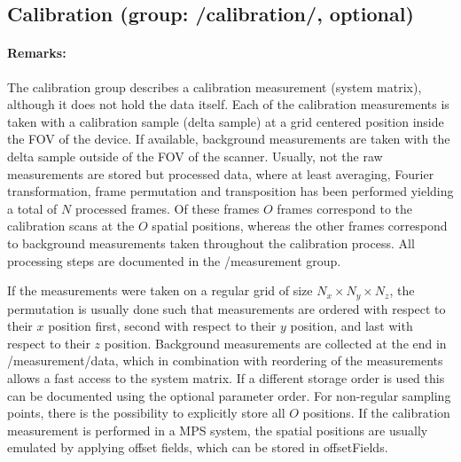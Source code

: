 \documentclass[landscape,a4paper]{article} %
\newcommand{\inlvar}[1]{{\ttfamily#1}}
\begin{document}
\newpage
\subsection{Calibration (group: \inlvar{/calibration/}, optional)}

\begin{multicols}{2}
\paragraph{Remarks:}
The calibration group describes a calibration measurement (system matrix), although it does not hold the data itself. Each of the calibration measurements is taken with a calibration sample (delta sample) at a grid centered position inside the FOV of the device. If available, background measurements are taken with the delta sample outside of the FOV of the scanner. Usually, not the raw measurements are stored but processed data, where at least averaging, Fourier transformation, frame permutation and transposition has been performed yielding a total of $N$ processed frames. Of these frames $O$ frames correspond to the calibration scans at the $O$ spatial positions, whereas the other frames correspond to background measurements taken throughout the calibration process. All processing steps are documented in the \inlvar{/measurement} group.

If the measurements were taken on a regular grid of size $N_x \times N_y \times N_z$, the permutation is usually done such that measurements are ordered with respect to their $x$ position first, second with respect to their $y$ position, and last with respect to their $z$ position. Background measurements are collected at the end in \inlvar{/measurement/data}, which in combination with reordering of the measurements allows a fast access to the system matrix. If a different storage order is used this can be documented using the optional parameter \inlvar{order}. For non-regular sampling points, there is the possibility to explicitly store all $O$ positions. If the calibration measurement is performed in a MPS system, the spatial positions are usually emulated by applying offset fields, which can be stored in \inlvar{offsetFields}.
\end{multicols}
\end{document}
